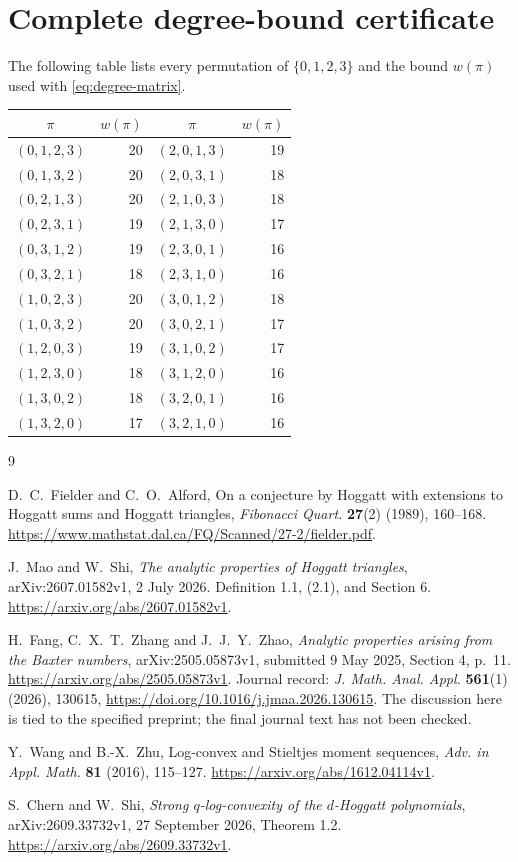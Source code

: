 \documentclass[11pt]{article}
\begin{document}
\appendix
\section{Complete degree-bound certificate}\label{app:degrees}
The following table lists every permutation of $\{0,1,2,3\}$ and
the bound $w(\pi)$ used with \eqref{eq:degree-matrix}.
\begin{center}\small
\begin{tabular}{c|r@{\qquad}c|r}
$\pi$&$w(\pi)$&$\pi$&$w(\pi)$\\\hline
$(0,1,2,3)$&20&$(2,0,1,3)$&19\\
$(0,1,3,2)$&20&$(2,0,3,1)$&18\\
$(0,2,1,3)$&20&$(2,1,0,3)$&18\\
$(0,2,3,1)$&19&$(2,1,3,0)$&17\\
$(0,3,1,2)$&19&$(2,3,0,1)$&16\\
$(0,3,2,1)$&18&$(2,3,1,0)$&16\\
$(1,0,2,3)$&20&$(3,0,1,2)$&18\\
$(1,0,3,2)$&20&$(3,0,2,1)$&17\\
$(1,2,0,3)$&19&$(3,1,0,2)$&17\\
$(1,2,3,0)$&18&$(3,1,2,0)$&16\\
$(1,3,0,2)$&18&$(3,2,0,1)$&16\\
$(1,3,2,0)$&17&$(3,2,1,0)$&16
\end{tabular}
\end{center}

\begin{thebibliography}{9}\footnotesize
\setlength{\itemsep}{2pt}
\raggedright
{}
D.~C.~Fielder and C.~O.~Alford,
On a conjecture by Hoggatt with extensions to Hoggatt sums and
Hoggatt triangles, \emph{Fibonacci Quart.} \textbf{27}(2)
(1989), 160--168.
\url{https://www.mathstat.dal.ca/FQ/Scanned/27-2/fielder.pdf}.

J.~Mao and W.~Shi, \emph{The analytic properties of Hoggatt triangles},
arXiv:2607.01582v1, 2 July 2026. Definition 1.1, (2.1), and Section 6.
\url{https://arxiv.org/abs/2607.01582v1}.

H.~Fang, C.~X.~T.~Zhang and J.~J.~Y.~Zhao,
\emph{Analytic properties arising from the Baxter numbers},
arXiv:2505.05873v1, submitted 9 May 2025, Section 4, p.~11.
\url{https://arxiv.org/abs/2505.05873v1}.
Journal record: \emph{J. Math. Anal. Appl.} \textbf{561}(1)
(2026), 130615, \url{https://doi.org/10.1016/j.jmaa.2026.130615}.
The discussion here is tied to the specified preprint; the final
journal text has not been checked.

Y.~Wang and B.-X.~Zhu, Log-convex and Stieltjes moment sequences,
\emph{Adv. in Appl. Math.} \textbf{81} (2016), 115--127.
\url{https://arxiv.org/abs/1612.04114v1}.

S.~Chern and W.~Shi, \emph{Strong $q$-log-convexity of the
$d$-Hoggatt polynomials}, arXiv:2609.33732v1, 27 September 2026,
Theorem 1.2.
\url{https://arxiv.org/abs/2609.33732v1}.
\end{thebibliography}
\end{document}
